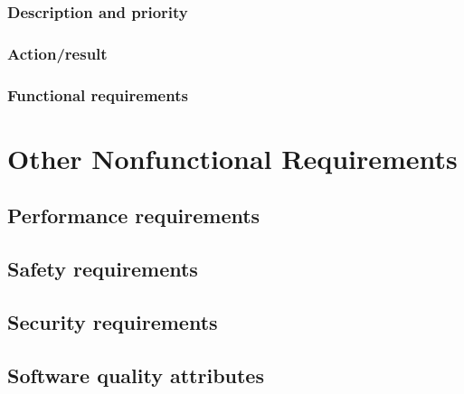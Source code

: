 \documentclass[10pt]{article}
\begin{document}
\subsubsection{Description and priority}

\lipsum[10]

\subsubsection{Action/result}

\lipsum[10]

\subsubsection{ Functional requirements}

\lipsum[10]








\section{Other Nonfunctional Requirements}

\subsection{Performance requirements}

\lipsum[10]

\subsection{Safety requirements}

\lipsum[10]

\subsection{Security requirements}

\lipsum[10]

\subsection{Software quality attributes}
\end{document}

